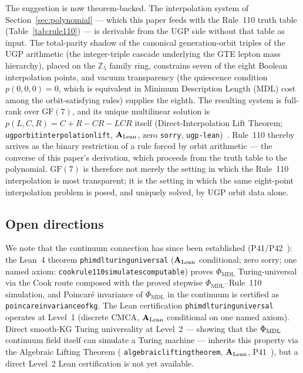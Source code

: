 \documentclass[11pt]{article}
\theoremstyle{remark}
\newcommand{\lean}[1]{%
  \penalty-100
  \begingroup\def\_{\textunderscore\allowbreak}\texttt{#1}\endgroup}
\newcommand{\CatAL}{\ensuremath{\textbf{A}_{\rm Lean}}}
\begin{document}
The suggestion is now theorem-backed.
The interpolation system of Section~\ref{sec:polynomial} --- which this paper
feeds with the Rule~110 truth table (Table~\ref{tab:rule110}) --- is derivable
from the UGP side without that table as input.
The total-parity shadow of the canonical generation-orbit triples of the UGP
arithmetic (the integer-triple cascade underlying the GTE lepton mass
hierarchy), placed on the $\mathbb{Z}_5$ family ring, constrains seven of the
eight Boolean interpolation points, and vacuum transparency (the quiescence
condition $p(0,0,0) = 0$, which is equivalent in Minimum Description Length
(MDL) cost among the orbit-satisfying rules) supplies the eighth.
The resulting system is full-rank over $\mathrm{GF}(7)$, and its unique
multilinear solution is $p(L,C,R) = C + R - CR - LCR$ itself
(Direct-Interpolation Lift Theorem;
\lean{ugp\_orbit\_interpolation\_lift}, $\CatAL$, zero \texttt{sorry},
\texttt{ugp-lean})~\cite{SpivackGTEPolynomialWolfram,SpivackGTECompleteFramework}.
Rule~110 thereby arrives as the binary restriction of a rule forced by orbit
arithmetic --- the converse of this paper's derivation, which proceeds from the
truth table to the polynomial.
$\mathrm{GF}(7)$ is therefore not merely the setting in which the Rule~110
interpolation is most transparent; it is the setting in which the same
eight-point interpolation problem is posed, and uniquely solved, by UGP orbit
data alone.

\subsection{Open directions}

We note that the continuum connection has since been established (P41/P42~\cite{SpivackCMCA,SpivackPhiMDLField}): the Lean~4 theorem \lean{phimdl\_turing\_universal} ($\CatAL$ conditional; zero sorry; one named axiom: \lean{cook\_rule110\_simulates\_computable}) proves $\Phi_{\mathrm{MDL}}$ Turing-universal via the Cook route composed with the proved stepwise $\Phi_{\mathrm{MDL}}$--Rule~110 simulation, and Poincar\'{e} invariance of $\Phi_{\mathrm{MDL}}$ in the continuum is certified as \lean{poincare\_invariance\_of\_kg}.
The Lean certification \lean{phimdl\_turing\_universal} operates at Level~1 (discrete
CMCA, $\CatAL$ conditional on one named axiom).  Direct smooth-KG Turing universality
at Level~2 --- showing that the $\Phi_{\rm MDL}$ continuum field itself can simulate a
Turing machine --- inherits this property via the Algebraic Lifting Theorem
(\lean{algebraic\_lifting\_theorem}, $\CatAL$, P41~\cite{SpivackCMCA}), but a direct
Level~2 Lean certification is not yet available.
\end{document}

